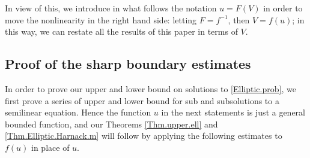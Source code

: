 \documentclass[11pt]{article}
\numberwithin{equation}{section}
\begin{document}
In view of this, we introduce in what follows the notation $u=F(V)$ in order to move the nonlinearity in the right hand side: letting $F=f^{-1}$, then $V=f(u)$; in this way, we can restate all the results of this paper in terms of $V$. \vspace{-4mm}


\subsection{Proof of the sharp boundary estimates}\label{subsect.Green.bdry}

In order to prove our upper and lower bound on solutions to \eqref{Elliptic.prob},
we first prove a series of upper and lower bound for sub and subsolutions to a semilinear equation.
Hence the function $u$ in the next statements is just a general bounded function, and our Theorems \ref{Thm.upper.ell} and \ref{Thm.Elliptic.Harnack.m} will follow by applying the following estimates to $f(u)$ in place of $u$.\vspace{-1mm}
\end{document}
